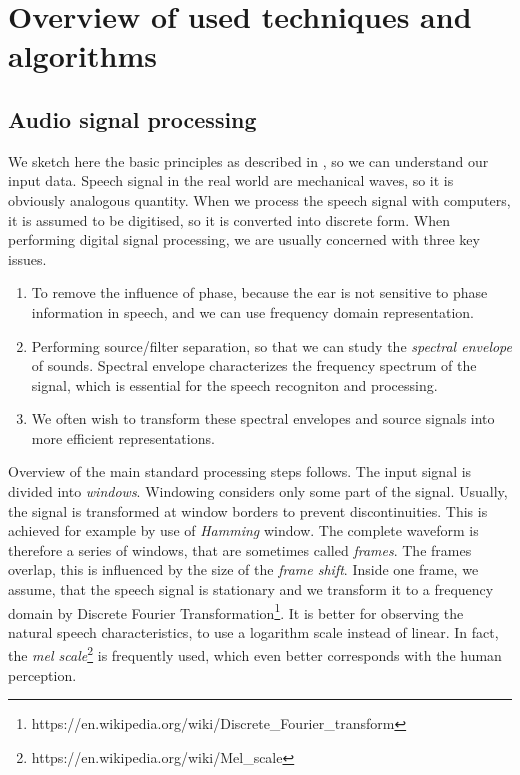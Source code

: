 \chapter{Overview of used techniques and algorithms}
\section{Audio signal processing}
\label{ASP-desc}
We sketch here the basic principles as described in \cite{taylor2009text}, so we can understand our input data.
Speech signal in the real world are mechanical waves, so it is obviously analogous quantity.
When we process the speech signal with computers, it is assumed to be digitised, so it is converted into discrete form.
When performing digital signal processing, we are usually concerned with three key issues.
\begin{enumerate}
\item To remove the influence of phase, because the ear is not sensitive to phase information in speech, and we can use frequency domain representation.
\item Performing source/filter separation, so that we can study the \textit{spectral envelope} of sounds.
Spectral envelope characterizes the frequency spectrum of the signal, which is essential for the speech recogniton and processing.
\item We often wish to transform these spectral envelopes and source signals into more efficient representations.
\end{enumerate}
Overview of the main standard processing steps follows.
\linebreak\linebreak
The input signal is divided into \textit{windows}.
Windowing considers only some part of the signal.
Usually, the signal is transformed at window borders to prevent discontinuities.
This is achieved for example by use of \textit{Hamming} window.
The complete waveform is therefore a series of windows, that are sometimes called \textit{frames}.
The frames overlap, this is influenced by the size of the \textit{frame shift}.
Inside one frame, we assume, that the speech signal is stationary and we transform it to a frequency domain by Discrete Fourier Transformation\footnote{https://en.wikipedia.org/wiki/Discrete\_Fourier\_transform}.
\linebreak\linebreak
It is better for observing the natural speech characteristics, to use a logarithm scale instead of linear.
In fact, the \textit{mel scale}\footnote{https://en.wikipedia.org/wiki/Mel\_scale} is frequently used, which even better corresponds with the human perception.
